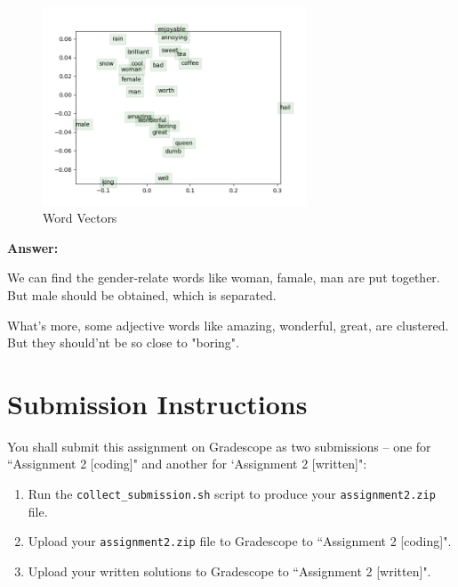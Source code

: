 \documentclass{article}
\newenvironment{answer}{
    {\bf Answer:} \sf \begingroup\color{red}
}{\endgroup}%
\begin{document}
\begin{enumerate}[label=(\alph*)]
    \begin{figure}[h]
        \centering
        \includegraphics[width = 0.7\textwidth]{../word_vectors.png}
        \caption{Word Vectors}
    \end{figure}

\begin{shaded}
\begin{answer}
    We can find the gender-relate words like woman, famale, man are put together. But male should be obtained, which is separated.

    What's more, some adjective words like amazing, wonderful, great, are clustered. But they should'nt be so close to "boring".
\end{answer}
\end{shaded}

\section{Submission Instructions}
You shall submit this assignment on Gradescope as two submissions -- one for ``Assignment 2 [coding]" and another for `Assignment 2 [written]":
\begin{enumerate}
    \item Run the \texttt{collect\_submission.sh} script to produce your \texttt{assignment2.zip} file.
    \item Upload your \texttt{assignment2.zip} file to Gradescope to ``Assignment 2 [coding]".
    \item Upload your written solutions to Gradescope to ``Assignment 2 [written]".
\end{enumerate}

\end{enumerate}
\end{document}
